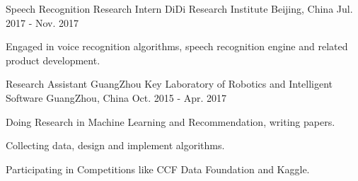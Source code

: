 \begin{cventries}
  \cventry
    {Speech Recognition Research Intern}
    {DiDi Research Institute}
    {Beijing, China}
    {Jul. 2017 - Nov. 2017}
    {
      \begin{cvitems}
        \item {Engaged in voice recognition algorithms, speech recognition engine and related product development.}
      \end{cvitems}
    }
  \cventry
    {Research Assistant}
    {GuangZhou Key Laboratory of Robotics and Intelligent Software}
    {GuangZhou, China}
    {Oct. 2015 - Apr. 2017}
    {
      \begin{cvitems}
        \item {Doing Research in Machine Learning and Recommendation, writing papers.}
        \item {Collecting data, design and implement algorithms.}
        \item {Participating in Competitions like CCF Data Foundation and Kaggle.}
      \end{cvitems}
    }
\end{cventries}